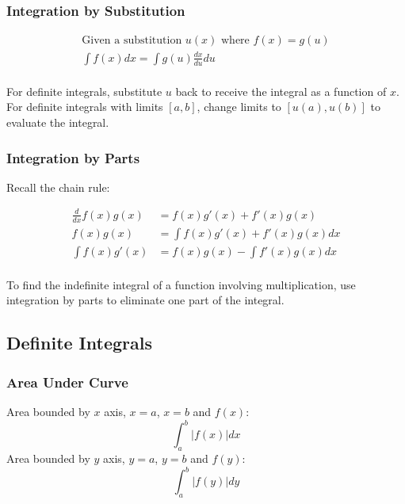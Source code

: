 \documentclass[../main]{subfiles}
\begin{document}
	\subsubsection{Integration by Substitution}

	\begin{equation*} \begin{aligned}
		\text{Given a substitution } u(x) \text{ where }  f(x)  = g(u) \\
		\int f(x) dx = \int g(u) \frac{dx}{du} du \\
	\end{aligned} \end{equation*}

	For definite integrals, substitute \(u\) back to receive the integral as a function of \(x\). For definite integrals with limits \([a,b]\), change limits to \([u(a),u(b)]\) to evaluate the integral.

	\subsubsection{Integration by Parts}

	Recall the chain rule:

	\begin{equation*} \begin{aligned}
		\frac{d}{dx} f(x) g(x) &= f(x)g'(x) + f'(x)g(x) \\
		f(x) g(x) &= \int f(x)g'(x) + f'(x)g(x) dx \\
		\int f(x)g'(x) &= f(x) g(x) - \int f'(x) g(x) dx \\
	\end{aligned} \end{equation*}

	To find the indefinite integral of a function involving multiplication, use integration by parts to eliminate one part of the integral.

\subsection{Definite Integrals}

	\subsubsection{Area Under Curve}

	Area bounded by \(x\) axis, \(x=a\), \(x=b\) and \(f(x)\):
		\[\int_a^b | f(x) | dx \]
	Area bounded by \(y\) axis, \(y=a\), \(y=b\) and \(f(y)\):
		\[\int_a^b | f(y) | dy \]
\end{document}
